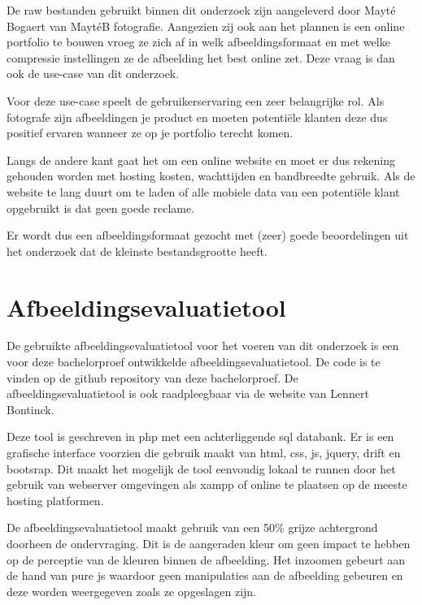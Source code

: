 De \gls{raw} bestanden gebruikt binnen dit onderzoek zijn aangeleverd door Mayté Bogaert van MaytéB fotografie. Aangezien zij ook aan het plannen is een online portfolio te bouwen vroeg ze zich af in welk \gls{afbeeldingsformaat} en met welke compressie instellingen ze de afbeelding het best online zet. Deze vraag is dan ook de \gls{use-case} van dit onderzoek.

Voor deze \gls{use-case} speelt de gebruikerservaring een zeer belangrijke rol. Als fotografe zijn afbeeldingen je product en moeten potentiële klanten deze dus positief ervaren wanneer ze op je portfolio terecht komen.

Langs de andere kant gaat het om een online website en moet er dus rekening gehouden worden met \gls{hosting} kosten, wachttijden en \gls{bandbreedte} gebruik. Als de website te lang duurt om te laden of alle mobiele data van een potentiële klant opgebruikt is dat geen goede reclame.

Er wordt dus een \gls{afbeeldingsformaat} gezocht met (zeer) goede beoordelingen uit het onderzoek dat de kleinste bestandsgrootte heeft.

\section{Afbeeldingsevaluatietool}
\label{sec:onderzoek-evaluatietool}

De gebruikte \gls{afbeeldingsevaluatietool} voor het voeren van dit onderzoek is een voor deze bachelorproef ontwikkelde \gls{afbeeldingsevaluatietool}. De code is te vinden op de \gls{github} repository van deze bachelorproef. De \gls{afbeeldingsevaluatietool} is ook raadpleegbaar via de website van Lennert Bontinck.

Deze tool is geschreven in \gls{php} met een achterliggende \gls{sql} databank. Er is een grafische interface voorzien die gebruik maakt van \gls{html}, \gls{css}, \gls{js}, \gls{jquery}, \gls{drift} en \gls{bootsrap}. Dit maakt het mogelijk de tool eenvoudig lokaal te runnen door het gebruik van webserver omgevingen als \gls{xampp} of online te plaatsen op de meeste \gls{hosting} platformen.

De \gls{afbeeldingsevaluatietool} maakt gebruik van een 50\% grijze achtergrond doorheen de ondervraging. Dit is de aangeraden kleur om geen impact te hebben op de perceptie van de kleuren binnen de afbeelding. Het inzoomen gebeurt aan de hand van pure \gls{js} waardoor geen manipulaties aan de afbeelding gebeuren en deze worden weergegeven zoals ze opgeslagen zijn. 

